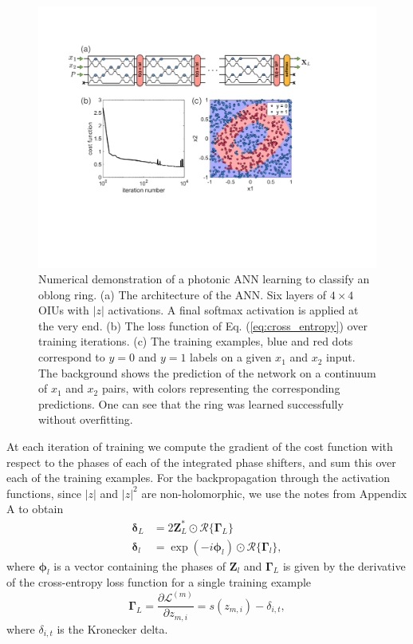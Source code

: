 \begin{figure}
\includegraphics[width=\columnwidth]{figures/insitu_ring}
\caption{Numerical demonstration of a photonic ANN learning to classify an oblong ring. (a) The architecture of the ANN.  Six layers of $4 \times 4$ OIUs with $|z|$ activations.  A final softmax activation is applied at the very end.  (b) The loss function of Eq. (\ref{eq:cross_entropy}) over training iterations. (c) The training examples, blue and red dots correspond to $y=0$ and $y=1$ labels on a given $x_1$ and $x_2$ input.  The background shows the prediction of the network on a continuum of $x_1$ and $x_2$ pairs, with colors representing the corresponding predictions.  One can see that the ring was learned successfully without overfitting.  \label{fig:demo} }
\end{figure}

At each iteration of training we compute the gradient of the cost function with respect to the phases of each of the integrated phase shifters, and sum this over each of the training examples. For the backpropagation through the activation functions, since $|z|$ and $|z|^2$ are non-holomorphic, we use the notes from Appendix A to obtain
%
\begin{align}
\bm{\delta}_L &= 2 \mathbf{Z}_L^* \odot \mathcal{R}\{\bm{\Gamma}_L\} \\
\bm{\delta}_l &= \exp(-i\bm{\phi}_l) \odot \mathcal{R}\{\bm{\Gamma}_l\},
\end{align}
where $\bm{\phi}_l$ is a vector containing the phases of $\mathbf{Z}_l$ and $\bm{\Gamma}_L$ is given by the derivative of the cross-entropy loss function for a single training example 
%
\begin{equation}
\bm{\Gamma}_L = \frac{\partial \mathcal{L}^{(m)}}{\partial z_{m, i}} = s(z_{m, i}) - \delta_{i, t},  
\end{equation}
%
where $\delta_{i, t}$ is the Kronecker delta. 

